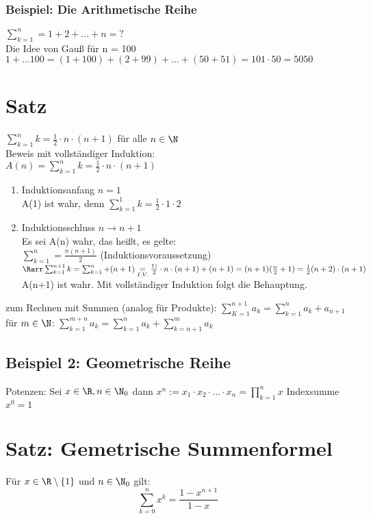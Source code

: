 \subsubsection*{Beispiel: Die Arithmetische Reihe}
$\sum_{k = 1}^{n} = 1 + 2 + ... + n = ?$\\
Die Idee von Gauß für n = 100\\
$1 + ... 100 = (1 + 100) + (2 + 99) + ... + (50 + 51) = 101 \cdot 50 = 5050$\\
\section{Satz}
$\sum_{k=1}^{n} k = \frac{1}{2} \cdot n \cdot (n+1)$ für alle $n \in \N$\\
Beweis mit vollständiger Induktion:\\
$A(n) = \sum_{k=1}^{n} k = \frac{1}{2} \cdot n \cdot (n + 1)$
\begin{enumerate}
\item Induktionsanfang $n = 1$\\
A(1) ist wahr, denn $\sum_{k=1}^{1} k = \frac{1}{2} \cdot 1 \cdot 2$ \ok
\item Induktionsschluss $n \to n + 1$\\
Es sei A(n) wahr, das heißt, es gelte:\\
$\sum_{k = 1}^{n} = \frac{n (n+1)}{2}$ (Induktionsvoraussetzung)\\
$\Rarr \sum_{k = 1}^{n + 1} k = \sum_{k = 1}^{n} + (n + 1) \underset{I.V.}{=} \frac{1)}{2} \cdot n \cdot (n+1) + (n+1) = (n+1)(\frac{n}{2} + 1) = \frac{1}{2} (n+2) \cdot (n+1)$
\Rarr A(n+1) ist wahr. Mit vollständiger Induktion folgt die Behauptung.
\end{enumerate}
\bem zum Rechnen mit Summen (analog für Produkte):
$\sum_{K = 1}^{n + 1} a_k = \sum_{k = 1}^{n} a_k + a_{n+1}$\\
für $m \in \N$: $\sum_{k=1}^{m+n} a_k = \sum_{k = 1}^{n} a_k + \sum_{k = n + 1}^{m} a_k$
\subsection*{Beispiel 2: Geometrische Reihe}
Potenzen: Sei $x\in \R, n \in \N_0$ dann $x^n := x_1 \cdot x_2 \cdot ... \cdot x_n = \prod_{k=1}^{n} x$
Indexsumme $x^0 = 1$
\section{Satz: Gemetrische Summenformel}
Für $x \in \R\setminus \{1\}$ und $n \in \N_0$ gilt:
$$\sum_{k = 0}^{n} x^k = \frac{1 - x^{n+1}}{1 - x}$$
